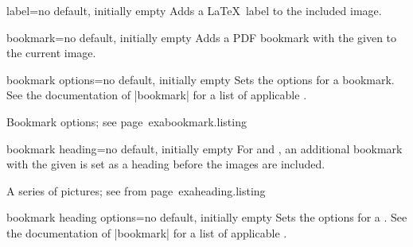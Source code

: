 \documentclass[a4paper,11pt]{ltxdoc}
\begin{document}
\clearpage

\begin{docIgrKey}{label}{=}{no default, initially empty}
  Adds a \LaTeX\ label to the included image.
\end{docIgrKey}


\begin{docIgrKey}{bookmark}{=}{no default, initially empty}
  Adds a PDF bookmark with the given  to the current image.
\end{docIgrKey}

\begin{docIgrKey}{bookmark options}{=}{no default, initially empty}
  Sets the options for a bookmark.
  See the documentation of
  |bookmark| \cite{package:bookmark} for a list of applicable .
\begin{texexptitled}%
  {Bookmark options; see page~\pageref{exabookmark}}{exabookmark.listing}
\end{texexptitled}
\end{docIgrKey}

\begin{docIgrKey}{bookmark heading}{=}{no default, initially empty}
  For  and , an additional bookmark with the given 
  is set as a heading before the images are included.
\begin{texexptitled}%
  {A series of pictures; see from page~\pageref{exaheading.1}}{exaheading.listing}
\end{texexptitled}
\end{docIgrKey}

\begin{docIgrKey}{bookmark heading options}{=}{no default, initially empty}
  Sets the options for a .
  See the documentation of
  |bookmark| \cite{package:bookmark} for a list of applicable .
\end{docIgrKey}
\end{document}
